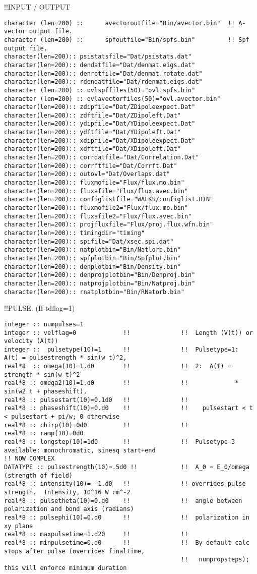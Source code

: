 !!{\large \quad INPUT / OUTPUT }
\begin{verbatim}
character (len=200) ::      avectoroutfile="Bin/avector.bin"  !! A-vector output file.        
character (len=200) ::      spfoutfile="Bin/spfs.bin"         !! Spf output file.
character(len=200):: psistatsfile="Dat/psistats.dat"
character(len=200):: dendatfile="Dat/denmat.eigs.dat"
character(len=200):: denrotfile="Dat/denmat.rotate.dat"
character(len=200):: rdendatfile="Dat/rdenmat.eigs.dat"
character (len=200) :: ovlspffiles(50)="ovl.spfs.bin"
character (len=200) :: ovlavectorfiles(50)="ovl.avector.bin"
character(len=200):: zdipfile="Dat/ZDipoleexpect.Dat"
character(len=200):: zdftfile="Dat/ZDipoleft.Dat"
character(len=200):: ydipfile="Dat/YDipoleexpect.Dat"
character(len=200):: ydftfile="Dat/YDipoleft.Dat"
character(len=200):: xdipfile="Dat/XDipoleexpect.Dat"
character(len=200):: xdftfile="Dat/XDipoleft.Dat"
character(len=200):: corrdatfile="Dat/Correlation.Dat"
character(len=200):: corrftfile="Dat/Corrft.Dat"
character(len=200):: outovl="Dat/Overlaps.dat"
character(len=200):: fluxmofile="Flux/flux.mo.bin"
character(len=200):: fluxafile="Flux/flux.avec.bin"
character(len=200):: configlistfile="WALKS/configlist.BIN"
character(len=200):: fluxmofile2="Flux/flux.mo.bin"
character(len=200):: fluxafile2="Flux/flux.avec.bin"
character(len=200):: projfluxfile="Flux/proj.flux.wfn.bin"
character(len=200):: timingdir="timing"
character(len=200):: spifile="Dat/xsec.spi.dat"
character(len=200):: natplotbin="Bin/Natlorb.bin"
character(len=200):: spfplotbin="Bin/Spfplot.bin"
character(len=200):: denplotbin="Bin/Density.bin"
character(len=200):: denprojplotbin="Bin/Denproj.bin"
character(len=200):: natprojplotbin="Bin/Natproj.bin"
character(len=200):: rnatplotbin="Bin/RNatorb.bin"
\end{verbatim}
!!{\large \quad PULSE.  (If tdflag=1) }
\begin{verbatim}
integer :: numpulses=1
integer :: velflag=0             !!              !!  Length (V(t)) or velocity (A(t))       
integer ::  pulsetype(10)=1      !!              !!  Pulsetype=1:  A(t) = pulsestrength * sin(w t)^2,
real*8  :: omega(10)=1.d0        !!              !!  2:  A(t) = strength * sin(w t)^2 
real*8 :: omega2(10)=1.d0        !!              !!             * sin(w2 t + phaseshift),
real*8 :: pulsestart(10)=0.1d0   !!              !!   
real*8 :: phaseshift(10)=0.d0    !!              !!    pulsestart < t < pulsestart + pi/w; 0 otherwise
real*8 :: chirp(10)=0d0          !!              !!
real*8 :: ramp(10)=0d0
real*8 :: longstep(10)=1d0       !!              !!  Pulsetype 3 available: monochromatic, sinesq start+end
!! NOW COMPLEX
DATATYPE :: pulsestrength(10)=.5d0 !!            !!  A_0 = E_0/omega (strength of field)  
real*8 :: intensity(10)= -1.d0   !!              !! overrides pulse strength.  Intensity, 10^16 W cm^-2 
real*8 :: pulsetheta(10)=0.d0    !!              !!  angle between polarization and bond axis (radians)
real*8 :: pulsephi(10)=0.d0      !!              !!  polarization in xy plane
real*8 :: maxpulsetime=1.d20     !!              !!  
real*8 :: minpulsetime=0.d0      !!              !!  By default calc stops after pulse (overrides finaltime,
                                                 !!   numpropsteps); this will enforce minimum duration
 \end{verbatim}
